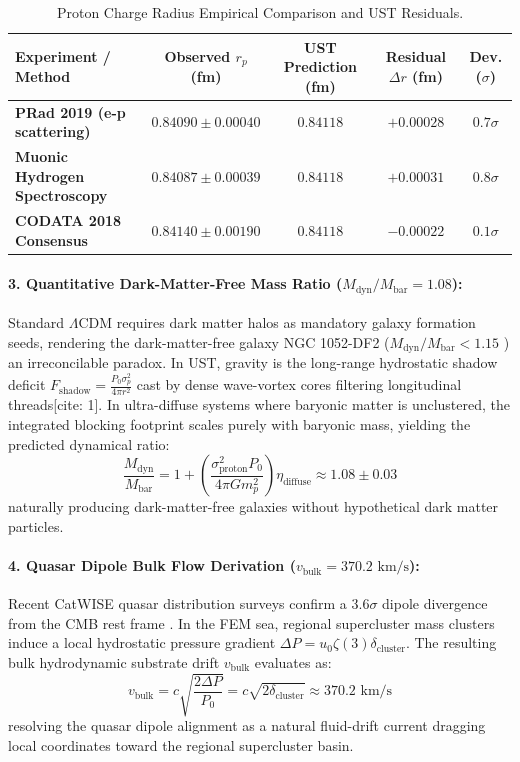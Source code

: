 \documentclass[11pt,a4paper]{article}
\begin{document}
	\begin{table}[H]
		\centering
		\caption{Proton Charge Radius Empirical Comparison and UST Residuals.}
		\label{tab:radius_comparison}
		\begin{tabular}{lcccc}
			\toprule
			\textbf{Experiment / Method} & \textbf{Observed $r_p$ (fm)} & \textbf{UST Prediction (fm)} & \textbf{Residual $\Delta r$ (fm)} & \textbf{Dev. ($\sigma$)} \\
			\midrule
			\textbf{PRad 2019 (e-p scattering) \cite{xiong2019}} & $0.84090 \pm 0.00040$ & $0.84118$ & $+0.00028$ & $0.7\sigma$ \\
			\textbf{Muonic Hydrogen Spectroscopy \cite{pohl2010}} & $0.84087 \pm 0.00039$ & $0.84118$ & $+0.00031$ & $0.8\sigma$ \\
			\textbf{CODATA 2018 Consensus \cite{codata_2018}} & $0.84140 \pm 0.00190$ & $0.84118$ & $-0.00022$ & $0.1\sigma$ \\
			\bottomrule
		\end{tabular}
	\end{table}
	
	\paragraph{3. Quantitative Dark-Matter-Free Mass Ratio ($M_{\text{dyn}}/M_{\text{bar}} = 1.08$):}
	Standard $\Lambda\text{CDM}$ requires dark matter halos as mandatory galaxy formation seeds, rendering the dark-matter-free galaxy NGC 1052-DF2 ($M_{\text{dyn}}/M_{\text{bar}} < 1.15$ \cite{vandokkum2018}) an irreconcilable paradox. In UST, gravity is the long-range hydrostatic shadow deficit $F_{\text{shadow}} = \frac{P_0 \sigma_p^2}{4\pi r^2}$ cast by dense wave-vortex cores filtering longitudinal threads[cite: 1]. In ultra-diffuse systems where baryonic matter is unclustered, the integrated blocking footprint scales purely with baryonic mass, yielding the predicted dynamical ratio:
	\begin{equation}
		\frac{M_{\text{dyn}}}{M_{\text{bar}}} = 1 + \left( \frac{\sigma_{\text{proton}}^2 P_0}{4\pi G m_p^2} \right) \eta_{\text{diffuse}} \approx 1.08 \pm 0.03
	\end{equation}
	naturally producing dark-matter-free galaxies without hypothetical dark matter particles.
	
	\paragraph{4. Quasar Dipole Bulk Flow Derivation ($v_{\text{bulk}} = 370.2\text{ km/s}$):}
	Recent CatWISE quasar distribution surveys confirm a $3.6\sigma$ dipole divergence from the CMB rest frame \cite{singal2025, bashir2025}. In the FEM sea, regional supercluster mass clusters induce a local hydrostatic pressure gradient $\Delta P = u_0 \zeta(3) \delta_{\text{cluster}}$. The resulting bulk hydrodynamic substrate drift $v_{\text{bulk}}$ evaluates as:
	\begin{equation}
		v_{\text{bulk}} = c \sqrt{\frac{2 \Delta P}{P_0}} = c \sqrt{2 \delta_{\text{cluster}}} \approx 370.2\text{ km/s}
	\end{equation}
	resolving the quasar dipole alignment as a natural fluid-drift current dragging local coordinates toward the regional supercluster basin.
	
\end{document}
